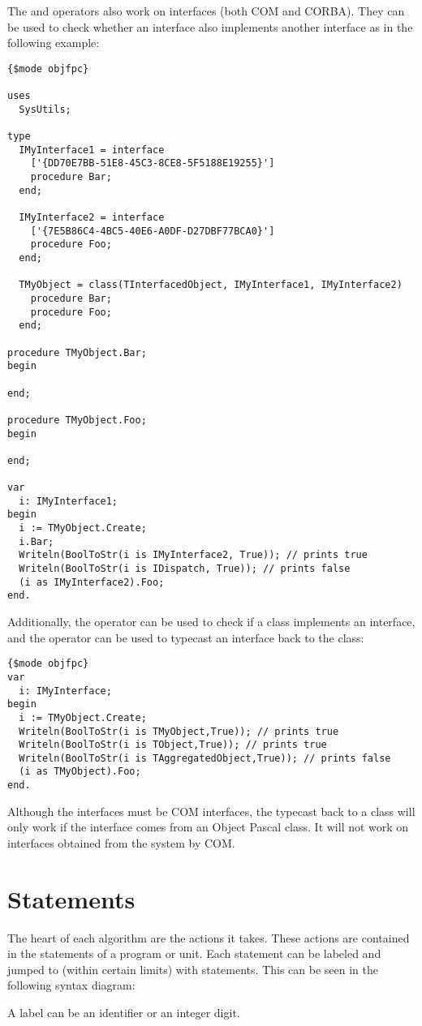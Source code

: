 The  and  operators also work on interfaces (both COM and
CORBA). They can be used to check whether an interface also implements another interface as in
the following example:
\begin{verbatim}
{$mode objfpc}

uses
  SysUtils;

type
  IMyInterface1 = interface
    ['{DD70E7BB-51E8-45C3-8CE8-5F5188E19255}']
    procedure Bar;
  end;

  IMyInterface2 = interface
    ['{7E5B86C4-4BC5-40E6-A0DF-D27DBF77BCA0}']
    procedure Foo;
  end;

  TMyObject = class(TInterfacedObject, IMyInterface1, IMyInterface2)
    procedure Bar;
    procedure Foo;
  end;

procedure TMyObject.Bar;
begin

end;

procedure TMyObject.Foo;
begin

end;

var
  i: IMyInterface1;
begin
  i := TMyObject.Create;
  i.Bar;
  Writeln(BoolToStr(i is IMyInterface2, True)); // prints true
  Writeln(BoolToStr(i is IDispatch, True)); // prints false
  (i as IMyInterface2).Foo;
end.
\end{verbatim}

Additionally, the  operator can be used to check if a class
implements an interface, and the  operator can be used to typecast an
interface back to the class:
\begin{verbatim}
{$mode objfpc}
var
  i: IMyInterface;
begin
  i := TMyObject.Create;
  Writeln(BoolToStr(i is TMyObject,True)); // prints true
  Writeln(BoolToStr(i is TObject,True)); // prints true
  Writeln(BoolToStr(i is TAggregatedObject,True)); // prints false
  (i as TMyObject).Foo;
end.
\end{verbatim}
Although the interfaces must be COM interfaces, the typecast back to a 
class will only work if the interface comes from an Object Pascal class. 
It will not work on interfaces obtained from the system by COM.

\chapter{Statements}
\label{ch:Statements}
The heart of each algorithm are the actions it takes. These actions are
contained in the statements of a program or unit. Each statement can be
labeled and jumped to (within certain limits) with  statements.
This can be seen in the following syntax diagram:

A label can be an identifier or an integer digit.


